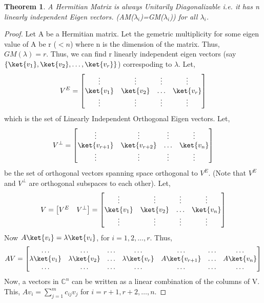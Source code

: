 \documentclass[12pt, oneside]{book}
\newtheorem{theorem}{Theorem}[section]
\theoremstyle{definition}
\theoremstyle{definition}
\theoremstyle{remark}
\begin{document}
\begin{theorem}
    A Hermitian Matrix is always Unitarily Diagonalizable i.e. it has n linearly independent Eigen vectors. (AM($\lambda_i$)=GM($\lambda_i$)) for all $\lambda_i$.
\end{theorem}
\begin{proof}
    Let A be a Hermitian matrix. Let the gemetric multiplicity for some eigen value of A be r ($<n$) where n is the dimension of the matrix.
    Thus, $GM(\lambda)=r$. Thus, we can find r linearly independent eigen vectors (say $\{\ket{v_1},\ket{v_2},\ldots,\ket{v_r}\}$) correspoding to $\lambda$.
    Let,
    \[V^E=\begin{bmatrix} \vdots & \vdots & \vdots & \vdots \\ \ket{v_1} & \ket{v_2} & \ldots & \ket{v_r} \\ \vdots & \vdots & \vdots & \vdots \end{bmatrix}\]
    which is the set of Linearly Independent Orthogonal Eigen vectors.
    Let,
    \[ V^{\perp} = \begin{bmatrix} \vdots & \vdots & \vdots & \vdots \\ \ket{v_{r+1}} & \ket{v_{r+2}} & \ldots & \ket{v_n} \\ \vdots & \vdots & \vdots & \vdots \end{bmatrix}\]
    be the set of orthogonal vectors spanning space orthogonal to $V^E$. (Note that $V^E$ and $V^{\perp}$ are orthogonal subspaces to each other).
    Let,
    \[V=\begin{bmatrix} V^E & V^{\perp} \end{bmatrix} = \begin{bmatrix} \vdots & \vdots & \vdots & \vdots \\ \ket{v_1} & \ket{v_2} & \ldots & \ket{v_n} \\ \vdots & \vdots & \vdots & \vdots \end{bmatrix}\]
    Now $A\ket{v_i}=\lambda\ket{v_i}$, for $i=1,2,\ldots,r$. Thus,
    \[ AV=\begin{bmatrix} \ldots & \ldots & \ldots & \ldots & \ldots & \ldots & \ldots \\ \lambda\ket{v_1} & \lambda\ket{v_2} & \ldots & \lambda\ket{v_r} & A\ket{v_{r+1}} & \ldots & A\ket{v_n} \\ \ldots & \ldots & \ldots & \ldots & \ldots  & \ldots & \ldots \end{bmatrix}\]
    Now, a vectors in $\mathbb{C}^n$ can be written as a linear combination of the columns of V. This, $Av_i=\sum_{j=1}^m c_{ij}v_j$ for $i=r+1,r+2,\ldots,n$.

\end{proof}
\end{document}

